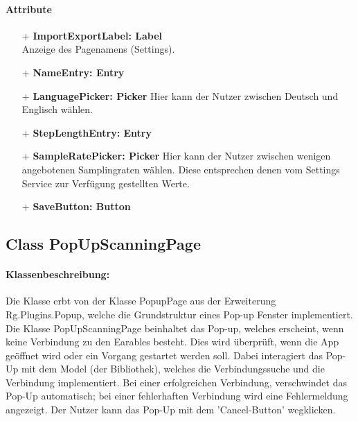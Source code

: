 \documentclass[a4paper,12pt]{article}
\begin{document}
		\paragraph{Attribute}
		\begin{itemize}
			\item[+] \textbf{ImportExportLabel: Label} \\ Anzeige des Pagenamens (Settings).
			\item [+]\textbf{NameEntry: Entry}
			\item [+]\textbf{LanguagePicker: Picker} Hier kann der Nutzer zwischen Deutsch und Englisch wählen.
			\item [+]\textbf{StepLengthEntry: Entry} 
			\item [+]\textbf{SampleRatePicker: Picker} Hier kann der Nutzer zwischen wenigen angebotenen Samplingraten wählen. Diese entsprechen denen vom Settings Service zur Verfügung gestellten Werte.
			\item [+]\textbf{SaveButton: Button}
		\end{itemize}

	\subsection{Class PopUpScanningPage}
		\paragraph{Klassenbeschreibung:}
		Die Klasse erbt von der Klasse PopupPage aus der Erweiterung \Gls{Rg.Plugins.Popup}, welche die Grundstruktur eines Pop-up Fenster implementiert.\\
		Die Klasse PopUpScanningPage beinhaltet das Pop-up, welches erscheint, wenn keine Verbindung zu den \gls{Earables} besteht. Dies wird überprüft, wenn die App geöffnet wird oder ein Vorgang gestartet werden soll. Dabei interagiert das Pop-Up mit dem Model (der Bibliothek), welches die Verbindungssuche und die Verbindung implementiert. Bei einer erfolgreichen Verbindung, verschwindet das Pop-Up automatisch; bei einer fehlerhaften Verbindung wird eine Fehlermeldung angezeigt. Der Nutzer kann das Pop-Up mit dem 'Cancel-Button' wegklicken. 
\end{document}
